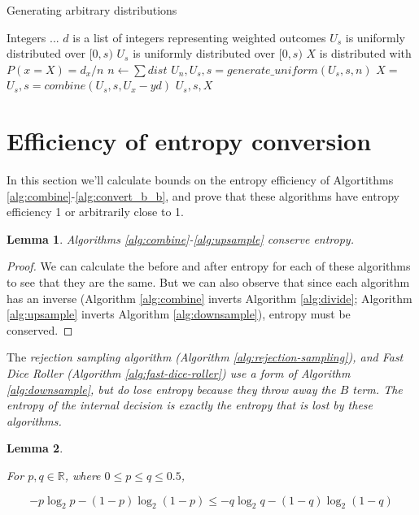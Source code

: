 \documentclass[12pt]{article}
\newtheorem{lemma}{Lemma}
\begin{document}
\begin{algorithm}

\caption{Generating arbitrary distributions}
\label{alg:generate_discrete}
\begin{algorithmic}[1]
    \Require Integers ...
    \Require $d$ is a list of integers representing weighted outcomes
    \Require $U_s$ is uniformly distributed over $[0,s)$
    \Ensure $U_s$ is uniformly distributed over $[0,s)$
    \Ensure $X$ is distributed with $P(x=X) = d_x/n$
    \State $n \gets \sum dist$
    \State $U_n, U_s, s = generate\_uniform(U_s, s, n)$
    \State $X = $
    \State $U_s, s = combine(U_s, s, U_x - y d)$
    \State \Return $U_s, s, X$
\EndProcedure
\end{algorithmic}
\end{algorithm}





\section {Efficiency of entropy conversion}

In this section we'll calculate bounds on the entropy efficiency of Algortithms \ref{alg:combine}-\ref{alg:convert_b_b}, and prove that these algorithms have entropy efficiency 1 or arbitrarily close to 1.

\begin{lemma}
\label{lem:conservation}
Algorithms \ref{alg:combine}-\ref{alg:upsample} conserve entropy.
\end{lemma}

\begin{proof}
We can calculate the before and after entropy for each of these algorithms to see that they are the same. But we can also observe that since each algorithm has an inverse (Algorithm \ref{alg:combine} inverts Algorithm \ref{alg:divide}; Algorithm \ref{alg:upsample} inverts Algorithm \ref{alg:downsample}), entropy must be conserved.
\end{proof}

The \em rejection sampling \em algorithm (Algorithm \ref{alg:rejection-sampling}), and Fast Dice Roller (Algorithm \ref{alg:fast-dice-roller}) use a form of Algorithm \ref{alg:downsample}, but do lose entropy because they throw away the $B$ term. The entropy of the internal decision is exactly the entropy that is lost by these algorithms.

\begin{lemma}
    \label{lem:shannon-inequality}

For $p,q \in \mathbb{R}$, where $0 \le p\le q \le 0.5$, 

\begin{equation}
-p\log_2 p - (1-p)\log_2(1-p) \le -q\log_2 q - (1-q)\log_2(1-q)
\end{equation}
\end{lemma}
\end{document}
